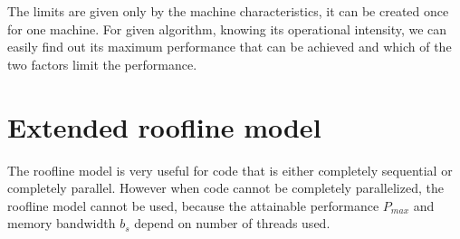 The limits are given only by the machine characteristics, it can be created once for one machine. For given algorithm, knowing its operational intensity, we can easily find out its maximum performance that can be achieved and which of the two factors limit the performance.

\section{Extended roofline model}
\label{sec:mrm}


The roofline model is very useful for code that is either completely sequential or completely parallel. However when code cannot be completely parallelized, the roofline model cannot be used, because the attainable performance $P_{max}$ and memory bandwidth $b_s$ depend on number of threads used.

